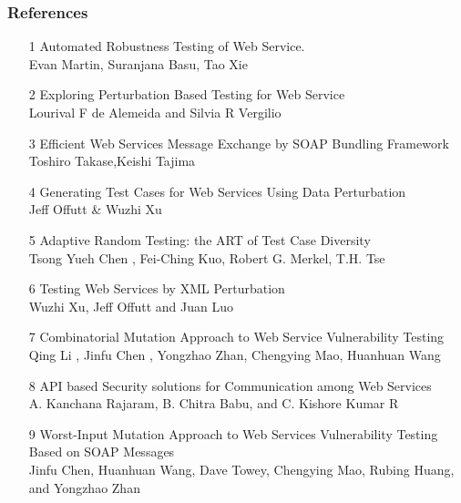 \documentclass[10pt]{beamer}
\begin{document}
\begin{frame}[t,allowframebreaks]
	\frametitle{References}
	\begin{enumerate}
		\item [1] Automated Robustness Testing of Web Service.\\
		Evan Martin, Suranjana Basu, Tao Xie
		\item [2] Exploring Perturbation Based Testing for Web Service \\
		Lourival F de Alemeida and Silvia R Vergilio
		\item [3] Efficient Web Services Message Exchange by SOAP Bundling Framework\\
		Toshiro Takase,Keishi Tajima
		\item [4] Generating Test Cases for Web Services Using Data Perturbation\\
		Jeff Offutt \& Wuzhi Xu
		\item [5] Adaptive Random Testing: the ART of Test Case Diversity\\
		Tsong Yueh Chen , Fei-Ching Kuo, Robert G. Merkel, T.H. Tse
		\item [6] Testing Web Services by XML Perturbation\\
		Wuzhi Xu, Jeff Offutt and Juan Luo

		\item [7] Combinatorial Mutation Approach to Web Service Vulnerability Testing \\
		Qing Li , Jinfu Chen , Yongzhao Zhan, Chengying Mao, Huanhuan Wang
		\item [8] API based Security solutions for
		Communication among Web Services\\
		A. Kanchana Rajaram, B. Chitra Babu, and C. Kishore Kumar R
		\item [9] Worst-Input Mutation Approach to Web Services Vulnerability Testing Based on SOAP Messages\\
		Jinfu Chen, Huanhuan Wang, Dave Towey, Chengying Mao, Rubing Huang, and Yongzhao Zhan
	\end{enumerate}
\end{frame}




{\1
\begin{frame}
\end{frame}}
\end{document}
